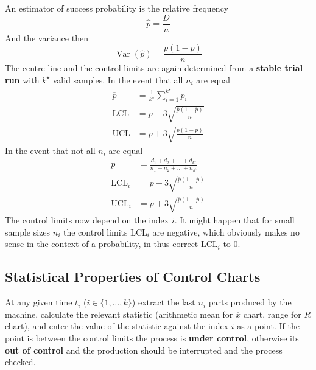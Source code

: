 \documentclass[11pt]{article}
\theoremstyle{definition}
\newcommand*\samplemean[1]{\overline{#1}}
\newcommand*\Var[1]{\mathop{\text{Var}}\left(#1\right)}
\begin{document}
\vspace{1em}
\noindent
An estimator of success probability is the relative frequency
\begin{equation*}
	\hat{p} = \frac{D}{n}
\end{equation*}
And the variance then
\begin{equation*}
	\Var{\hat{p}} = \frac{p(1-p)}{n}
\end{equation*}
The centre line and the control limits are again determined from a \textbf{stable trial run} with $k^\star$ valid samples. In the event that all $n_i$ are equal
\begin{align*}
	\samplemean{p} &= \frac{1}{k^\star}\sum_{i=1}^{k^\star}p_i\\
	\text{LCL} &= \samplemean{p} - 3 \sqrt{\frac{\samplemean{p}(1-\samplemean{p})}{n}}\\
	\text{UCL} &= \samplemean{p} + 3 \sqrt{\frac{\samplemean{p}(1-\samplemean{p})}{n}}
\end{align*}
In the event that not all $n_i$ are equal
\begin{align*}
	\samplemean{p} &= \frac{d_1 + d_2 + \dots + d_{k^\star}}{n_1 + n_2 + \dots + n_{k^\star}}\\
	\text{LCL}_i &= \samplemean{p} - 3 \sqrt{\frac{\samplemean{p}(1-\samplemean{p})}{n}}\\
	\text{UCL}_i &= \samplemean{p} + 3 \sqrt{\frac{\samplemean{p}(1-\samplemean{p})}{n}}
\end{align*}
The control limits now depend on the index $i$. It might happen that for small sample sizes $n_i$ the control limits $\text{LCL}_i$ are negative, which obviously makes no sense in the context of a probability, in thus correct $\text{LCL}_i$ to $0$.

\subsection{Statistical Properties of Control Charts}
At any given time $t_i$ ($i\in\{1,\dots,k\}$) extract the last $n_i$ parts produced by the machine, calculate the relevant statistic (arithmetic mean for $\samplemean{x}$ chart, range for $R$ chart), and enter the value of the statistic against the index $i$ as a point. If the point is between the control limits the process is \textbf{under control}, otherwise its \textbf{out of control} and the production should be interrupted and the process checked.
\end{document}
